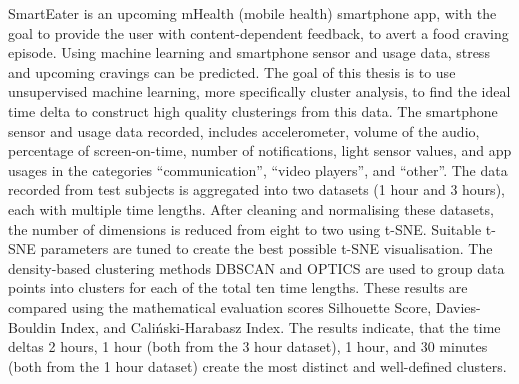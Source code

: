 SmartEater is an upcoming mHealth (mobile health) smartphone app, with the goal to provide the user with content-dependent feedback, to avert a food craving episode. Using machine learning and  smartphone sensor and usage data, stress and upcoming cravings can be predicted. The goal of this thesis is to use unsupervised machine learning, more specifically cluster analysis, to find the ideal time delta to construct high quality clusterings from this data. The smartphone sensor and usage data recorded, includes accelerometer, volume of the audio, percentage of screen-on-time, number of notifications, light sensor values, and app usages in the categories “communication”, “video players”, and “other”. The data recorded from test subjects is aggregated into two datasets (1 hour and 3 hours), each with multiple time lengths. After cleaning and normalising these datasets, the number of dimensions is reduced from eight to two using t-SNE. Suitable t-SNE parameters are tuned to create the best possible t-SNE visualisation. The density-based clustering methods DBSCAN and OPTICS are used to group data points into clusters for each of the total ten time lengths. These results are compared using the mathematical evaluation scores Silhouette Score, Davies-Bouldin Index, and Caliński-Harabasz Index. The results indicate, that the time deltas 2 hours, 1 hour (both from the 3 hour dataset), 1 hour, and 30 minutes (both from the 1 hour dataset) create the most distinct and well-defined clusters.